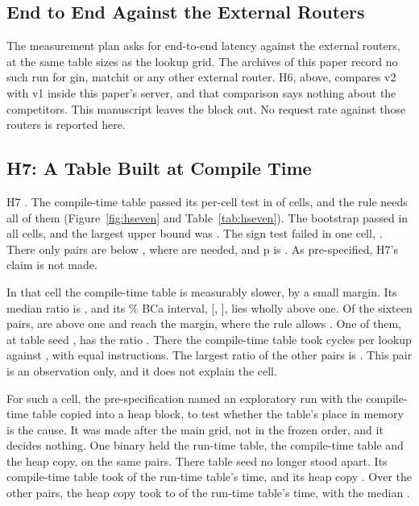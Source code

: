 \subsection{End to End Against the External Routers}\label{sec:e2e-gap}

The measurement plan asks for end-to-end latency against the external routers, at the same table
sizes as the lookup grid.
The archives of this paper record no such run for gin, matchit or any other external router.
H6, above, compares v2 with v1 inside this paper's server, and that comparison says nothing about
the competitors.
This manuscript leaves the block out.
No request rate against those routers is reported here.

\subsection{H7: A Table Built at Compile Time}\label{sec:hseven}

H7 \HSevenVerdict. The compile-time table passed its per-cell test in \HSevenHeld{} of
\HSevenCells{} cells, and the rule needs all of them (Figure~\ref{fig:hseven} and
Table~\ref{tab:hseven}). The bootstrap passed in all \HSevenHeldBoot{} cells, and the largest upper
bound was \HSevenMaxHigh. The sign test failed in one cell, \HSevenLostCell. There only
\HSevenLostSignX{} pairs are below \Margin, where \HSevenSignNeed{} are needed, and p is
\HSevenLostPSign. As pre-specified, H7's claim is not made.

In that cell the compile-time table is measurably slower, by a small margin. Its median ratio is
\HSevenLostRatio, and its \Level\% BCa interval, [\HSevenLostLow, \HSevenLostHigh], lies wholly above
one. Of the sixteen pairs, \HSevenLostAboveOne{} are above one and \HSevenLostAboveMargin{} reach the
margin, where the rule allows \HSevenAllowedAbove. One of them, at table seed \HSevenLostSeed,
has the ratio \HSevenLostMaxPair. There the compile-time table took \HSevenLostSeedCyclesCt{} cycles
per lookup against \HSevenLostSeedCyclesRt, with equal instructions. The largest ratio of the other
pairs is \HSevenLostOthersMax. This pair is an observation only, and it does not explain the cell.

 For such a cell, the pre-specification named an exploratory run
with the compile-time table copied into a heap block, to test whether the table's place in memory is
the cause. It was made after the main grid, not in the frozen order, and it decides nothing. One
binary held the run-time table, the compile-time table and the heap copy, on the same
\ExCtHeapPairs{} pairs. There table seed \ExCtHeapSeed{} no longer stood apart. Its compile-time table
took \ExCtHeapCtRtSeed{} of the run-time table's time, and its heap copy \ExCtHeapHeapRtSeed. Over the
other pairs, the heap copy took \ExCtHeapHeapRtOthersMin{} to \ExCtHeapHeapRtOthersMax{} of the
run-time table's time, with the median \ExCtHeapHeapRtOthersMedian.

